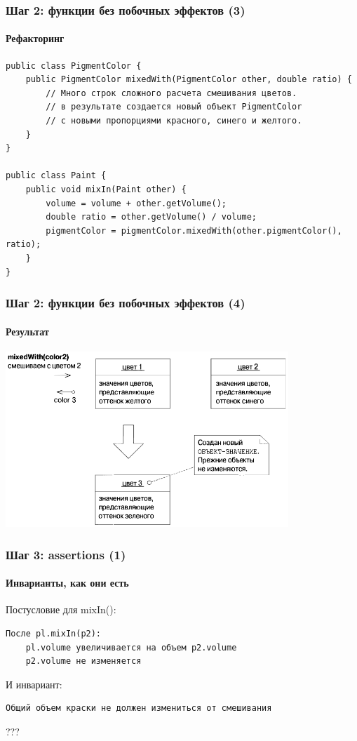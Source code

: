 \documentclass[xetex,mathserif,serif]{beamer}
\begin{document}
	\begin{frame}[fragile]
		\frametitle{Шаг 2: функции без побочных эффектов (3)}
		\framesubtitle{Рефакторинг}
		\begin{footnotesize}
			\begin{verbatim}
public class PigmentColor {
    public PigmentColor mixedWith(PigmentColor other, double ratio) {
        // Много строк сложного расчета смешивания цветов.
        // в результате создается новый объект PigmentColor
        // с новыми пропорциями красного, синего и желтого.
    }
}

public class Paint {
    public void mixIn(Paint other) {
        volume = volume + other.getVolume();
        double ratio = other.getVolume() / volume;
        pigmentColor = pigmentColor.mixedWith(other.pigmentColor(), ratio);
    }
}
			\end{verbatim}
		\end{footnotesize}
\end{frame}

	\begin{frame}
		\frametitle{Шаг 2: функции без побочных эффектов (4)}
		\framesubtitle{Результат}
		\begin{center}
			\includegraphics[width=0.8\textwidth]{pigmentColorValueObject.png}
		\end{center}
	\end{frame}

	\begin{frame}[fragile]
		\frametitle{Шаг 3: assertions (1)}
		\framesubtitle{Инварианты, как они есть}
		Постусловие для mixIn():
		{\color{blue}
		\begin{verbatim}
После pl.mixIn(p2):
    pl.volume увеличивается на объем p2.volume
    p2.volume не изменяется
\end{verbatim} }
		И инвариант:
		{\color{blue}
		\begin{verbatim}
Общий объем краски не должен измениться от смешивания
\end{verbatim} }
	???
\end{frame}
\end{document}
